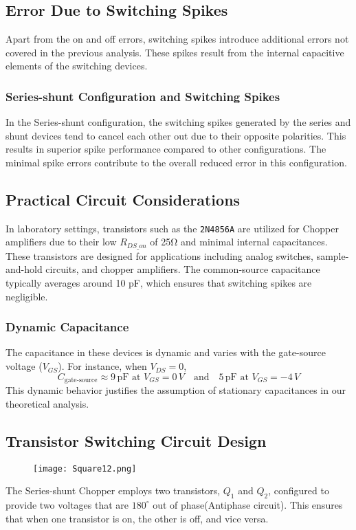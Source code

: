 \documentclass[a4paper,9pt,twoside,openany,twocolumn]{memoir}
\begin{document}
\subsection{Error Due to Switching Spikes}
Apart from the on and off errors, switching spikes introduce additional errors not covered in the previous analysis. These spikes result from the internal capacitive elements of the switching devices.

\subsubsection{Series-shunt Configuration and Switching Spikes}
In the Series-shunt configuration, the switching spikes generated by the series and shunt devices tend to cancel each other out due to their opposite polarities. This results in superior spike performance compared to other configurations. The minimal spike errors contribute to the overall reduced error in this configuration.

\subsection{Practical Circuit Considerations}
In laboratory settings, transistors such as the \texttt{2N4856A} are utilized for Chopper amplifiers due to their low \( R_{DS\_on} \) of 25Ω and minimal internal capacitances. These transistors are designed for applications including analog switches, sample-and-hold circuits, and chopper amplifiers. The common-source capacitance typically averages around 10 pF, which ensures that switching spikes are negligible.

\subsubsection{Dynamic Capacitance}
The capacitance in these devices is dynamic and varies with the gate-source voltage (\( V_{GS} \)). For instance, when \( V_{DS} = 0 \),
\[
C_{\text{gate-source}} \approx 9\,\text{pF at } V_{GS} = 0\,V \quad \text{and} \quad 5\,\text{pF at } V_{GS} = -4\,V
\]
This dynamic behavior justifies the assumption of stationary capacitances in our theoretical analysis.

\subsection{Transistor Switching Circuit Design}
\begin{figure}[h]
    \centering
    \texttt{[image: Square12.png]}
    \caption{}
\end{figure}
The Series-shunt Chopper employs two transistors, \( Q_1 \) and \( Q_2 \), configured to provide two voltages that are \(180^\circ\) %
 out of phase(Antiphase circuit). This ensures that when one transistor is on, the other is off, and vice versa.
\end{document}
